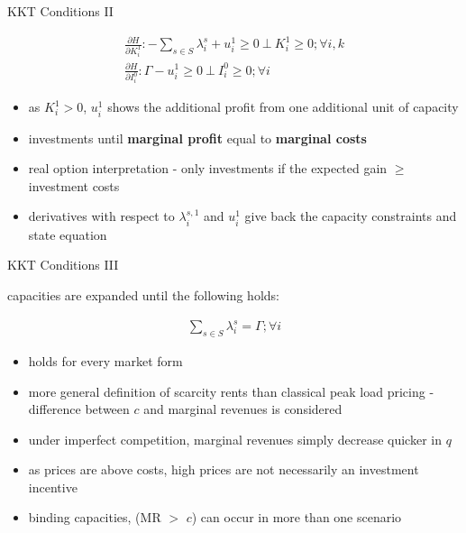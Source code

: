 \begin{frame}{KKT Conditions II}

\begin{gather}
\tfrac{\partial H}{ \partial K^1_{i}}:  -\sum_{s\in S}  \lambda_{i}^{s} + u_{i}^1 \geq 0 \ \bot \ K^1_{i} \geq 0 ; \forall i,k \label{eq:foc3} \\
\tfrac{\partial H}{ \partial I_{i}^{0}}: \Gamma - u_{i}^1 \geq 0 \ \bot \ I_{i}^{0} \geq 0 ;\forall i \label{eq:foc4}
\end{gather}

\begin{itemize}
	\item as $K^1_{i} > 0$, $u_{i}^1$ shows the additional profit from one additional unit of capacity
	\item investments until \textbf{marginal profit} equal to \textbf{marginal costs}
	\item real option interpretation - only investments if the expected gain $\geq$ investment costs
\end{itemize}

\begin{itemize}
	\item derivatives with respect to  $\lambda_{i}^{s,1}$ and $u_{i}^1$ give back the capacity constraints and state equation
\end{itemize}

\end{frame}

\begin{frame}{KKT Conditions III}

capacities are expanded until the following holds:

\begin{gather}
\sum_{s\in S}\lambda_{i}^{s} = \Gamma \label{eq:invcondition};  \forall i
\end{gather}

\begin{itemize}
	\item holds for every market form
	\item more general definition of scarcity rents than classical peak load pricing - difference between $c$ and marginal revenues is considered
	\item under imperfect competition, marginal revenues simply decrease quicker in $q$
	\item as prices are above costs, high prices are not necessarily an investment incentive
	\item binding capacities, (MR $>$ $c$) can occur in more than one scenario
\end{itemize}

\end{frame}

